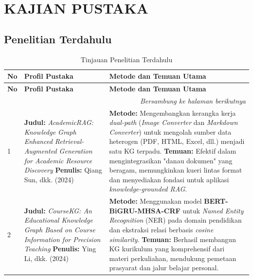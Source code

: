 \chapter{KAJIAN PUSTAKA}

\section{Penelitian Terdahulu}

\begin{longtable}{|p{0.5cm}|p{4cm}|p{5cm}|}
	\caption{Tinjauan Penelitian Terdahulu} \\
	\hline
	\textbf{No} & \textbf{Profil Pustaka} & \textbf{Metode dan Temuan Utama} \\ \hline
	\endfirsthead
	\hline
	\textbf{No} & \textbf{Profil Pustaka} & \textbf{Metode dan Temuan Utama} \\ \hline
	\endhead
	\hline
	\multicolumn{3}{r}{\textit{Bersambung ke halaman berikutnya}} \\
	\endfoot
	\hline
	\endlastfoot
	
	1 & 
	\textbf{Judul:} \textit{AcademicRAG: Knowledge Graph Enhanced Retrieval-Augmented Generation for Academic Resource Discovery} \newline
	\textbf{Penulis:} Qiang Sun, dkk. (2024) \cite{sun2024docs2kg} &
	\textbf{Metode:} Mengembangkan kerangka kerja \textit{dual-path} (\textit{Image Converter} dan \textit{Markdown Converter}) untuk mengolah sumber data heterogen (PDF, HTML, Excel, dll.) menjadi satu KG terpadu. \newline
	\textbf{Temuan:} Efektif dalam mengintegrasikan "danau dokumen" yang beragam, memungkinkan kueri lintas format dan menyediakan fondasi untuk aplikasi \textit{knowledge-grounded RAG}. \\
	\hline 
	
	2 & 
	\textbf{Judul:} \textit{CourseKG: An Educational Knowledge Graph Based on Course Information for Precision Teaching} \newline
	\textbf{Penulis:} Ying Li, dkk. (2024) \cite{coursekg} &
	\textbf{Metode:} Menggunakan model \textbf{BERT-BiGRU-MHSA-CRF} untuk \textit{Named Entity Recognition} (NER) pada domain pendidikan dan ekstraksi relasi berbasis \textit{cosine similarity}. \newline
	\textbf{Temuan:} Berhasil membangun KG kurikulum yang komprehensif dari materi perkuliahan, mendukung pemetaan prasyarat dan jalur belajar personal. \\
	\hline
	

\end{longtable}
